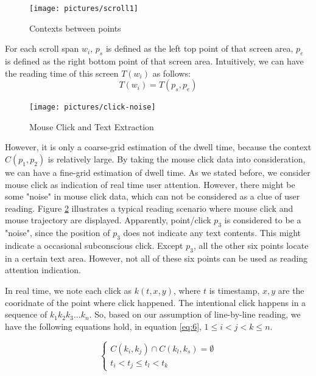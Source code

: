 \documentclass{sigchi}
\begin{document}
\begin{figure}[!h]
\centering
\texttt{[image: pictures/scroll1]}
\caption{Contexts between points}
\label{fig:context_points}
\end{figure}

For each scroll span $w_i$, $p_s$ is defined as the left top point of that screen area, $p_e$ is defined as the right bottom point of that screen area. Intuitively, 
we can have the reading time of  this screen $T(w_i)$ as follows:
\begin{equation} \label{eq:5}
T(w_i) = T(p_s,p_e)
\end{equation}

\begin{figure}[!h]
\centering
\texttt{[image: pictures/click-noise]}
\caption{Mouse Click and Text Extraction}
\label{fig:click-noise}
\end{figure}

However, it is only a coarse-grid  estimation of the dwell time, because the context  $C(p_1,p_2)$ is relatively large. By taking the 
mouse click data into consideration, we can have a fine-grid estimation of dwell time. As we stated before, we consider mouse click 
as indication of real time user attention. However, there might be some "noise"  in mouse click data, which can not be considered as 
a clue of user reading. Figure \ref{fig:click-noise} illustrates a typical reading scenario where mouse click and mouse trajectory are 
displayed. Apparently, point/click $p_3$ is considered to be a "noise", since the position of $p_3$ does not indicate any text contents.
This might indicate a occasional subconscious click. Except $p_3$, all the  other six points locate in a certain text area. However, not all
of these six points can be used as reading attention indication.

 In real time, we note each click as  $k(t,x,y)$, where $t$ is timestamp, $x,y$ are the cooridnate of the point where click happened. 
The intentional click happens in a sequence of $k_1 k_2 k_3 ... k_n$. So, based on our assumption of line-by-line reading, we have the following equations 
hold, in equation \ref{eq:6}, $1 \le i < j < k \le n$.

\begin{equation} \label{eq:6}
\left\{ {\begin{array}{*{20}{c}}
{C({k_i},{k_j}) \cap C({k_l},{k_s}) = \emptyset }\\
{{t_i} < {t_j} \le{t_l} < {t_k}}
\end{array}} \right.
\end{equation}
\end{document}
